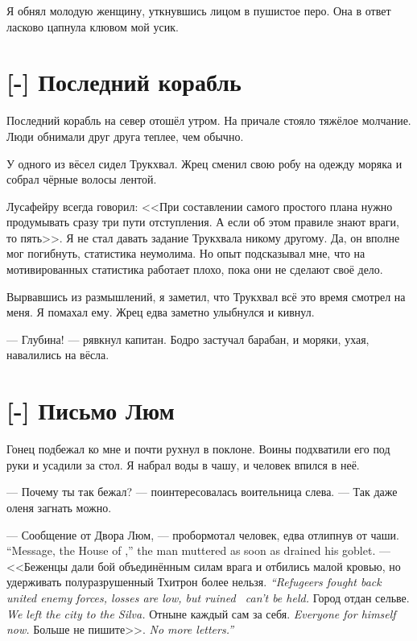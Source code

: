 Я обнял молодую женщину, уткнувшись лицом в пушистое перо.
Она в ответ ласково цапнула клювом мой усик.

\section{[-] Последний корабль}

Последний корабль на север отошёл утром.
На причале стояло тяжёлое молчание.
Люди обнимали друг друга теплее, чем обычно.

У одного из вёсел сидел Трукхвал.
Жрец сменил свою робу на одежду моряка и собрал чёрные волосы лентой.

Лусафейру всегда говорил: <<При составлении самого простого плана нужно продумывать сразу три пути отступления.
А если об этом правиле знают враги, то пять>>.
Я не стал давать задание Трукхвала никому другому.
Да, он вполне мог погибнуть, статистика неумолима.
Но опыт подсказывал мне, что на мотивированных статистика работает плохо, пока они не сделают своё дело.

Вырвавшись из размышлений, я заметил, что Трукхвал всё это время смотрел на меня.
Я помахал ему.
Жрец едва заметно улыбнулся и кивнул.

--- Глубина! --- рявкнул капитан.
Бодро застучал барабан, и моряки, ухая, навалились на вёсла.

\section{[-] Письмо Люм}

\textspace

Гонец подбежал ко мне и почти рухнул в поклоне.
Воины подхватили его под руки и усадили за стол.
Я набрал воды в чашу, и человек впился в неё.

--- Почему ты так бежал? --- поинтересовалась воительница слева.
--- Так даже оленя загнать можно.

{--- Сообщение от Двора Люм, --- пробормотал человек, едва отлипнув от чаши.}
{``Message, the House of \Loem,'' the man muttered as soon as drained his goblet.}
{--- <<Беженцы дали бой объединённым силам врага и отбились малой кровью, но удерживать полуразрушенный Тхитрон более нельзя.}
{\emph{``Refugeers fought back united enemy forces, losses are low, but ruined \Tchitron\ can't be held.}}
{Город отдан сельве.}
{\emph{We left the city to the Silva.}}
{Отныне каждый сам за себя.}
{\emph{Everyone for himself now.}}
{Больше не пишите>>.}
{\emph{No more letters.''}}

